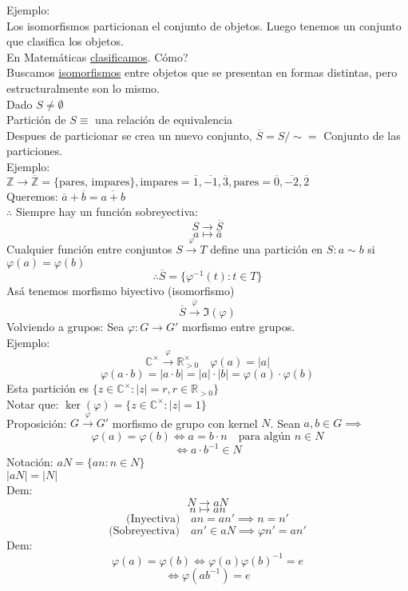 \documentclass[11pt]{book}
\theoremstyle{definition}
\begin{document}
Ejemplo:\\
Los isomorfismos particionan el conjunto de objetos. Luego tenemos un conjunto que clasifica los objetos.\\
En Matemáticas \underline{clasificamos}. Cómo?\\
Buscamos \underline{isomorfismos} entre objetos que se presentan en formas distintas, pero estructuralmente son lo mismo.\\
Dado $S\neq\emptyset$\\
Partición de $S\equiv$ una relación de equivalencia\\
Despues de particionar se crea un nuevo conjunto, $\overline{S}=S/\sim=$ Conjunto de las particiones.\\
Ejemplo:\\
$\mathbb{Z}\rightarrow\overline{\mathbb{Z}}=\{\textrm{pares, impares}\},\textrm{impares}=\overline{1},\overline{-1},\overline{3},\textrm{pares}=\overline{0},\overline{-2},\overline{2}$\\
Queremos: $\overline{a}+\overline{b}=\overline{a+b}$\\
$\therefore$ Siempre hay un función sobreyectiva:
\[
S\rightarrow \overline{S}
\]
\[
a\mapsto \overline{a}
\]
Cualquier función entre conjuntos $S\xrightarrow{\varphi}T$ define una partición en $S:a\sim b$ si $\varphi(a)=\varphi(b)$
\[
\therefore \overline{S}=\{\varphi^{-1}(t):t\in T\}
\]
Asá­ tenemos morfismo biyectivo (isomorfismo)
\[
\overline{S}\xrightarrow{\overline{\varphi}}\Im(\varphi)
\]
Volviendo a grupos: Sea $\varphi:G\rightarrow G'$ morfismo entre grupos.\\
Ejemplo:
\[
\mathbb{C}^\times\xrightarrow{\varphi}\mathbb{R}_{>0}^\times \quad \varphi(a)=|a|
\]
\[
\varphi(a\cdot b)=|a\cdot b|=|a|\cdot |b|=\varphi(a)\cdot\varphi(b)
\]
Esta partición es $\{z\in\mathbb{C}^\times:|z|=r,r\in\mathbb{R}_{>0}\}$\\
Notar que: $\ker(\varphi)=\{z\in\mathbb{C}^\times:|z|=1\}$\\
Proposición: $G\xrightarrow{\varphi}G'$ morfismo de grupo con kernel $N$. Sean $a,b\in G\implies$
\[
\varphi(a)=\varphi(b)\iff a=b\cdot n\quad\textrm{para algún }n\in N
\]
\[
\iff a\cdot b^{-1}\in N
\]
Notación: $aN=\{an: n\in N\}$\\
$|aN|=|N|$\\
Dem:
\[
N\rightarrow aN
\]
\[n\mapsto an
\]
\[
\textrm{(Inyectiva)}\quad an=an'\implies n=n'
\]
\[
\textrm{(Sobreyectiva)}\quad an'\in aN \implies \varphi{n'}=an'
\]
Dem:
\[
\varphi(a)=\varphi(b)\iff \varphi(a)\varphi(b)^{-1}=e
\]
\[
\iff \varphi(ab^{-1})=e
\]
\end{document}
